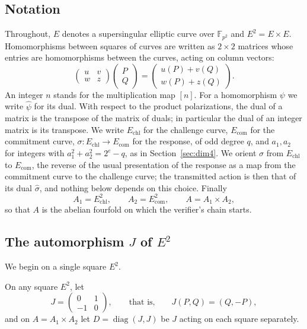 \documentclass[version=preprint]{iacrcc}
\newcommand{\Ecom}{E_{\mathrm{com}}}
\newcommand{\Echl}{E_{\mathrm{chl}}}
\begin{document}
    \subsection{Notation}
    \label{sec:sym-notation}
    Throughout, $E$ denotes a supersingular elliptic curve over
    $\mathbb{F}_{p^2}$ and $E^2 = E \times E$. Homomorphisms between squares of
    curves are written as $2 \times 2$ matrices whose entries are homomorphisms
    between the curves, acting on column vectors:
    \[
    \begin{pmatrix} u & v \\ w & z \end{pmatrix}
    \begin{pmatrix} P \\ Q \end{pmatrix}
    =
    \begin{pmatrix} u(P) + v(Q) \\ w(P) + z(Q) \end{pmatrix}.
    \]
    An integer $n$ stands for the multiplication map $[n]$. For a homomorphism
    $\psi$ we write $\widehat{\psi}$ for its dual. With respect to the product
    polarizations, the dual of a matrix is the transpose of the matrix of
    duals; in particular the dual of an integer matrix is its transpose. We
    write $\Echl$ for the challenge curve, $\Ecom$ for the commitment curve,
    $\sigma \colon \Echl \to \Ecom$ for the response, of odd degree $q$, and $a_1, a_2$ for integers with $a_1^2 +
    a_2^2 = 2^e - q$, as in Section~\ref{sec:dim4}. We orient $\sigma$ from
    $\Echl$ to $\Ecom$, the reverse of the usual presentation of the response
    as a map from the commitment curve to the challenge curve; the transmitted
    action is then that of its dual $\widehat\sigma$, and nothing below depends
    on this choice. Finally
    \[
    A_1 = \Echl^2, \qquad A_2 = \Ecom^2, \qquad A = A_1 \times A_2,
    \]
    so that $A$ is the abelian fourfold on which the verifier's chain starts.

    \subsection{The automorphism \texorpdfstring{$J$}{J} of \texorpdfstring{$E^2$}{E\^{}2}}
    \label{app:J}
    We begin on a single square $E^2$.

    \begin{definition}
        On any square $E^2$, let
        \[
        J = \begin{pmatrix} 0 & 1 \\ -1 & 0 \end{pmatrix},
        \qquad\text{that is,}\qquad
        J(P, Q) = (Q, -P),
        \]
        and on $A = A_1 \times A_2$ let $D = \operatorname{diag}(J, J)$ be $J$
        acting on each square separately.
    \end{definition}
\end{document}
